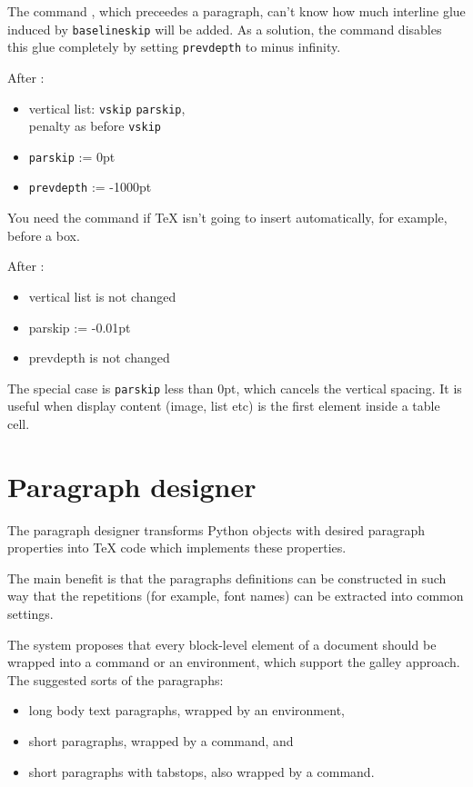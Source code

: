 \documentclass[]{ltugboat}
\begin{document}
The command , which preceedes a paragraph, can't know how much interline glue induced by \verb|baselineskip| will be added. As a solution, the command disables this glue completely by setting \verb|prevdepth| to minus infinity.

\medskip

After :

\begin{itemize}
\item vertical list: \verb|vskip| \verb|parskip|,\\penalty as before \verb|vskip|
\item \verb|parskip| := 0pt
\item \verb|prevdepth| := -1000pt
\end{itemize}

You need the command  if \TeX{} isn't going to insert  automatically, for example, before a box.

\medskip

After :

\begin{itemize}
\item vertical list is not changed
\item parskip := -0.01pt
\item prevdepth is not changed
\end{itemize}

The special case is \verb|parskip| less than 0pt, which cancels the vertical spacing. It is useful when display content (image, list etc) is the first element inside a table cell.

\section{Paragraph designer}

The paragraph designer transforms Python objects with desired paragraph properties into \TeX{} code which implements these properties.

The main benefit is that the paragraphs definitions can be constructed in such way that the repetitions (for example, font names) can be extracted into common settings.

The system proposes that every block-level element of a document should be wrapped into a command or an environment, which support the galley approach. The suggested sorts of the paragraphs:

\begin{itemize}
\item long body text paragraphs, wrapped by an environment,
\item short paragraphs, wrapped by a command, and
\item short paragraphs with tabstops, also wrapped by a command.
\end{itemize}
\end{document}

